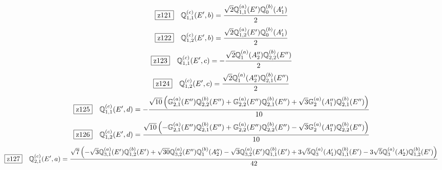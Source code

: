 \documentclass[fleqn,10pt,landscape]{jsarticle}
\begin{document}
\begin{dmath*}
\hspace*{3mm}\fbox{z121}\quad \mathbb{Q}_{1,1}^{(c)}(E^{\prime},b)=\frac{\sqrt{2} \mathbb{Q}_{1,1}^{(a)}(E^{\prime}) \mathbb{Q}_{0}^{(b)}(A_{1}^{\prime})}{2}
\end{dmath*}
\begin{dmath*}
\hspace*{3mm}\fbox{z122}\quad \mathbb{Q}_{1,2}^{(c)}(E^{\prime},b)=\frac{\sqrt{2} \mathbb{Q}_{1,2}^{(a)}(E^{\prime}) \mathbb{Q}_{0}^{(b)}(A_{1}^{\prime})}{2}
\end{dmath*}
\begin{dmath*}
\hspace*{3mm}\fbox{z123}\quad \mathbb{Q}_{1,1}^{(c)}(E^{\prime},c)=- \frac{\sqrt{2} \mathbb{Q}_{1}^{(a)}(A_{2}^{\prime\prime}) \mathbb{Q}_{2,2}^{(b)}(E^{\prime\prime})}{2}
\end{dmath*}
\begin{dmath*}
\hspace*{3mm}\fbox{z124}\quad \mathbb{Q}_{1,2}^{(c)}(E^{\prime},c)=\frac{\sqrt{2} \mathbb{Q}_{1}^{(a)}(A_{2}^{\prime\prime}) \mathbb{Q}_{2,1}^{(b)}(E^{\prime\prime})}{2}
\end{dmath*}
\begin{dmath*}
\hspace*{3mm}\fbox{z125}\quad \mathbb{Q}_{1,1}^{(c)}(E^{\prime},d)=- \frac{\sqrt{10} \left(\mathbb{G}_{2,1}^{(a)}(E^{\prime\prime}) \mathbb{Q}_{2,2}^{(b)}(E^{\prime\prime}) + \mathbb{G}_{2,2}^{(a)}(E^{\prime\prime}) \mathbb{Q}_{2,1}^{(b)}(E^{\prime\prime}) + \sqrt{3} \mathbb{G}_{2}^{(a)}(A_{1}^{\prime\prime}) \mathbb{Q}_{2,1}^{(b)}(E^{\prime\prime})\right)}{10}
\end{dmath*}
\begin{dmath*}
\hspace*{3mm}\fbox{z126}\quad \mathbb{Q}_{1,2}^{(c)}(E^{\prime},d)=\frac{\sqrt{10} \left(- \mathbb{G}_{2,1}^{(a)}(E^{\prime\prime}) \mathbb{Q}_{2,1}^{(b)}(E^{\prime\prime}) + \mathbb{G}_{2,2}^{(a)}(E^{\prime\prime}) \mathbb{Q}_{2,2}^{(b)}(E^{\prime\prime}) - \sqrt{3} \mathbb{G}_{2}^{(a)}(A_{1}^{\prime\prime}) \mathbb{Q}_{2,2}^{(b)}(E^{\prime\prime})\right)}{10}
\end{dmath*}
\begin{dmath*}
\hspace*{3mm}\fbox{z127}\quad \mathbb{Q}_{2,1}^{(c)}(E^{\prime},a)=\frac{\sqrt{7} \left(- \sqrt{3} \mathbb{Q}_{3,1}^{(a)}(E^{\prime}) \mathbb{Q}_{1,2}^{(b)}(E^{\prime}) + \sqrt{30} \mathbb{Q}_{3,2}^{(a)}(E^{\prime\prime}) \mathbb{Q}_{1}^{(b)}(A_{2}^{\prime\prime}) - \sqrt{3} \mathbb{Q}_{3,2}^{(a)}(E^{\prime}) \mathbb{Q}_{1,1}^{(b)}(E^{\prime}) + 3 \sqrt{5} \mathbb{Q}_{3}^{(a)}(A_{1}^{\prime}) \mathbb{Q}_{1,1}^{(b)}(E^{\prime}) - 3 \sqrt{5} \mathbb{Q}_{3}^{(a)}(A_{2}^{\prime}) \mathbb{Q}_{1,2}^{(b)}(E^{\prime})\right)}{42}
\end{dmath*}
\end{document}
